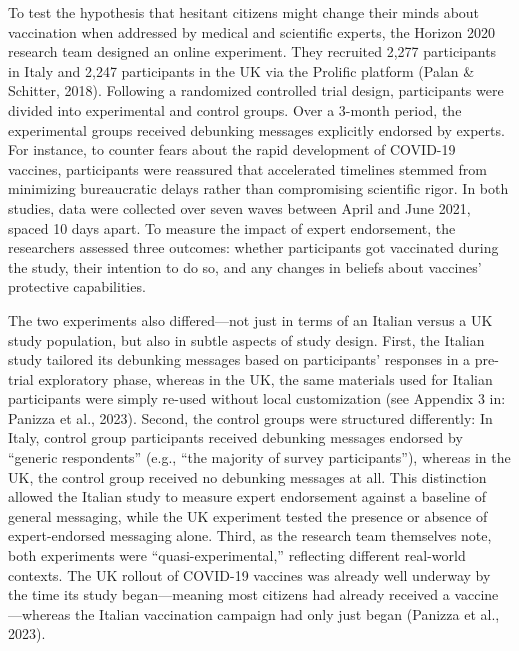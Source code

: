 \documentclass[authordate, reflection]{jote-new-article}
\begin{document}
	To test the hypothesis that hesitant citizens might change their minds about vaccination when addressed by medical and scientific experts, the Horizon 2020 research team designed an online experiment. They recruited 2,277 participants in Italy and 2,247 participants in the UK via the Prolific platform (Palan \& Schitter, 2018). Following a randomized controlled trial design, participants were divided into experimental and control groups. Over a 3-month period, the experimental groups received debunking messages explicitly endorsed by experts. For instance, to counter fears about the rapid development of COVID-19 vaccines, participants were reassured that accelerated timelines stemmed from minimizing bureaucratic delays rather than compromising scientific rigor. In both studies, data were collected over seven waves between April and June 2021, spaced 10 days apart. To measure the impact of expert endorsement, the researchers assessed three outcomes: whether participants got vaccinated during the study, their intention to do so, and any changes in beliefs about vaccines' protective capabilities.







	The two experiments also differed—not just in terms of an Italian versus a UK study population, but also in subtle aspects of study design. First, the Italian study tailored its debunking messages based on participants' responses in a pre-trial exploratory phase, whereas in the UK, the same materials used for Italian participants were simply re-used without local customization (see Appendix 3 in: Panizza et al., 2023). Second, the control groups were structured differently: In Italy, control group participants received debunking messages endorsed by “generic respondents” (e.g., “the majority of survey participants”), whereas in the UK, the control group received no debunking messages at all. This distinction allowed the Italian study to measure expert endorsement against a baseline of general messaging, while the UK experiment tested the presence or absence of expert-endorsed messaging alone. Third, as the research team themselves note, both experiments were “quasi-experimental,” reflecting different real-world contexts. The UK rollout of COVID-19 vaccines was already well underway by the time its study began—meaning most citizens had already received a vaccine—whereas the Italian vaccination campaign had only just began (Panizza et al., 2023).
\end{document}
